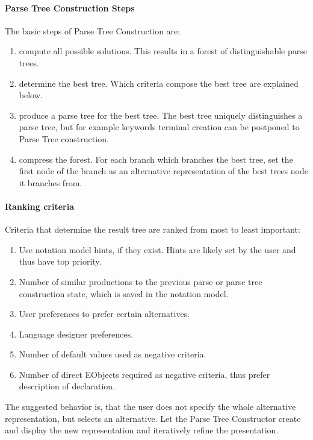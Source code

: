 \paragraph{Parse Tree Construction Steps}
The basic steps of Parse Tree Construction are:
\begin{enumerate}
	\item compute all possible solutions. This results in a forest of distinguishable parse trees.
	\item determine the best tree. Which criteria compose the best tree are explained below.
	\item produce a parse tree for the best tree. The best tree uniquely distinguishes a parse tree, but for example keywords terminal creation can be postponed to Parse Tree construction.
	\item compress the forest. For each branch which branches the best tree, set the first node of the branch as an alternative representation of the best trees node it branches from.\\
\end{enumerate}

\paragraph{Ranking criteria} Criteria that determine the result tree are ranked from most to least important:
\begin{enumerate}
	\item Use notation model hints, if they exist. Hints are likely set by the user and thus have top priority.
	\item Number of similar productions to the previous parse or parse tree construction state, which is saved in the notation model.
	\item User preferences to prefer certain alternatives.
	\item Language designer preferences.
	\item Number of default values used as negative criteria.
	\item Number of direct EObjects required as negative criteria, thus prefer description of declaration.
\end{enumerate}

The suggested behavior is, that the user does not specify the whole alternative representation, but selects an alternative. Let the Parse Tree Constructor create and display the new representation and iteratively refine the presentation. 


